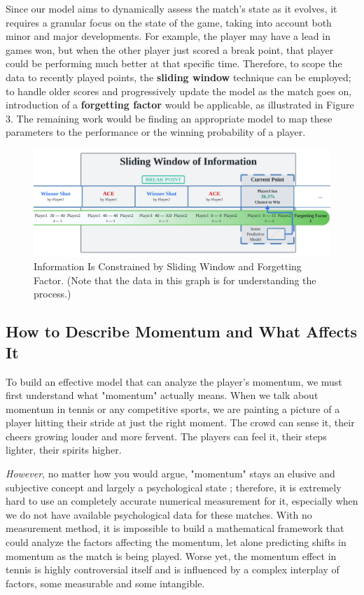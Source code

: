 \documentclass[12pt]{article}  %
\begin{document}
Since our model aims to dynamically assess the match's state as it evolves, it requires a granular focus on the state of the game, taking into account both minor and major developments. For example, the player may have a lead in games won, but when the other player just scored a break point, that player could be performing much better at that specific time. Therefore, to scope the data to recently played points, the \textbf{sliding window} technique can be employed; to handle older scores and progressively update the model as the match goes on, introduction of a \textbf{forgetting factor} would be applicable, as illustrated in Figure 3. The remaining work would be finding an appropriate model to map these parameters to the performance or the winning probability of a player. 

\begin{figure}[htbp]  %
	\centering  %
	\includegraphics[width=.85\textwidth]{sliding-window.png} %
	\caption{\centering Information Is Constrained by Sliding Window and Forgetting Factor. (Note that the data in this graph is for understanding the process.)} %
\end{figure}

\subsection{How to Describe Momentum and What Affects It}
To build an effective model that can analyze the player's momentum, we must first understand what "momentum" actually means. When we talk about momentum in tennis or any competitive sports, we are painting a picture of a player hitting their stride at just the right moment. The crowd can sense it, their cheers growing louder and more fervent. The players can feel it, their steps lighter, their spirits higher. 

\textit{However}, no matter how you would argue, "momentum" stays an elusive and subjective concept and largely a psychological state \cite{-1}; therefore, it is extremely hard to use an completely accurate numerical measurement for it, especially when we do not have available psychological data for these matches. With no measurement method, it is impossible to build a mathematical framework that could analyze the factors affecting the momentum, let alone predicting shifts in momentum as the match is being played. Worse yet, the momentum effect in tennis is highly controversial itself and is influenced by a complex interplay of factors, some measurable and some intangible.
\end{document}
